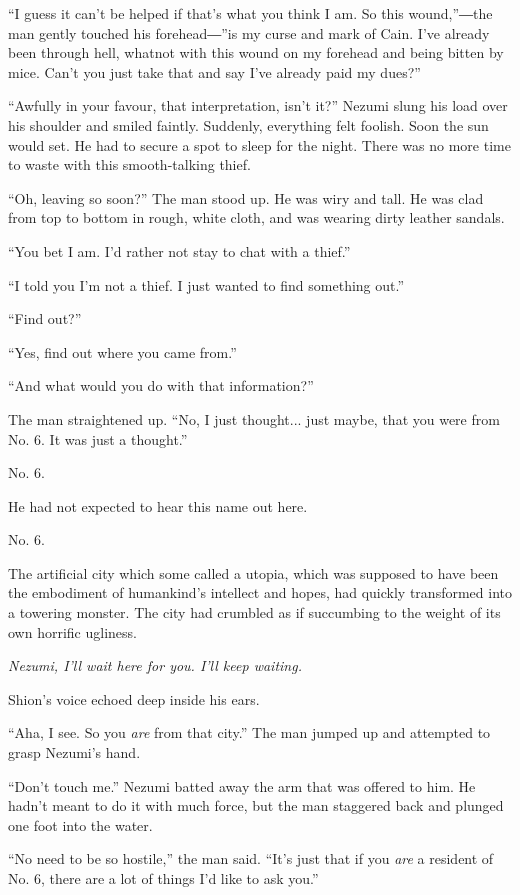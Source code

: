 ``I guess it can't be helped if that's what you think I am. So this
wound,''―the man gently touched his forehead―''is my curse and mark of
Cain. I've already been through hell, whatnot with this wound on my
forehead and being bitten by mice. Can't you just take that and say I've
already paid my dues?''

``Awfully in your favour, that interpretation, isn't it?'' Nezumi slung
his load over his shoulder and smiled faintly. Suddenly, everything felt
foolish. Soon the sun would set. He had to secure a spot to sleep for
the night. There was no more time to waste with this smooth-talking
thief.

``Oh, leaving so soon?'' The man stood up. He was wiry and tall. He was
clad from top to bottom in rough, white cloth, and was wearing dirty
leather sandals.

``You bet I am. I'd rather not stay to chat with a thief.''

``I told you I'm not a thief. I just wanted to find something out.''

``Find out?''

``Yes, find out where you came from.''

``And what would you do with that information?''

The man straightened up. ``No, I just thought... just maybe, that you
were from No. 6. It was just a thought.''

No. 6.

He had not expected to hear this name out here.

No. 6.

The artificial city which some called a utopia, which was supposed to
have been the embodiment of humankind's intellect and hopes, had quickly
transformed into a towering monster. The city had crumbled as if
succumbing to the weight of its own horrific ugliness.

\emph{Nezumi, I'll wait here for you. I'll keep waiting.}

Shion's voice echoed deep inside his ears.

``Aha, I see. So you \emph{are} from that city.'' The man jumped up and
attempted to grasp Nezumi's hand.

``Don't touch me.'' Nezumi batted away the arm that was offered to him.
He hadn't meant to do it with much force, but the man staggered back and
plunged one foot into the water.

``No need to be so hostile,'' the man said. ``It's just that if you \emph{are}
a resident of No. 6, there are a lot of things I'd like to ask you.''

